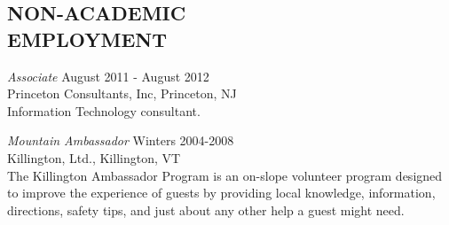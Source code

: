 \documentclass[line,overlapped]{res}
\begin{document}
\begin{resume}
\newpage
         
 \section{NON-ACADEMIC\\EMPLOYMENT}             
         {\sl Associate} \hfill August 2011 - August 2012\\
         Princeton Consultants, Inc, Princeton, NJ\\
         Information Technology consultant.

         {\it Mountain Ambassador} \hfill Winters 2004-2008\\
         Killington, Ltd., Killington, VT \\
         The Killington Ambassador Program is an on-slope volunteer program
         designed to improve the experience of guests by providing local knowledge, 
         information, directions, safety tips, and just about any other help a guest might need.


\end{resume}
\end{document}
